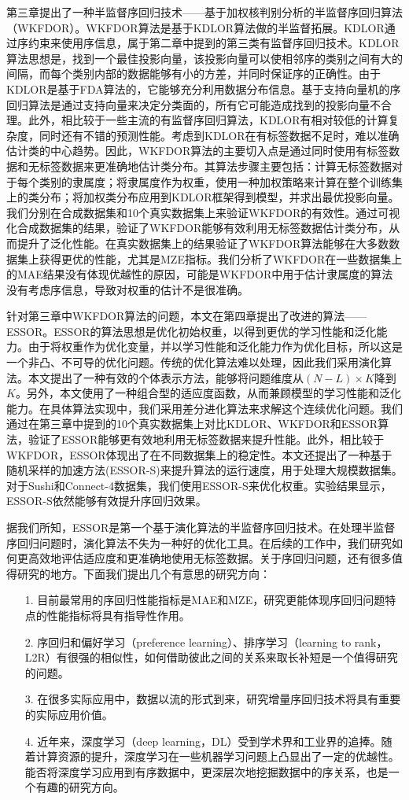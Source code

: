 第三章提出了一种半监督序回归技术——基于加权核判别分析的半监督序回归算法（WKFDOR）。WKFDOR算法是基于KDLOR算法做的半监督拓展。KDLOR通过序约束来使用序信息，属于第二章中提到的第三类有监督序回归技术。KDLOR算法思想是，找到一个最佳投影向量，该投影向量可以使相邻序的类别之间有大的间隔，而每个类别内部的数据能够有小的方差，并同时保证序的正确性。由于KDLOR是基于FDA算法的，它能够充分利用数据分布信息。基于支持向量机的序回归算法是通过支持向量来决定分类面的，所有它可能造成找到的投影向量不合理。此外，相比较于一些主流的有监督序回归算法，KDLOR有相对较低的计算复杂度，同时还有不错的预测性能。考虑到KDLOR在有标签数据不足时，难以准确估计类的中心趋势。因此，WKFDOR算法的主要切入点是通过同时使用有标签数据和无标签数据来更准确地估计类分布。其算法步骤主要包括：计算无标签数据对于每个类别的隶属度；将隶属度作为权重，使用一种加权策略来计算在整个训练集上的类分布；将加权类分布应用到KDLOR框架得到模型，并求出最优投影向量。我们分别在合成数据集和10个真实数据集上来验证WKFDOR的有效性。通过可视化合成数据集的结果，验证了WKFDOR能够有效利用无标签数据估计类分布，从而提升了泛化性能。在真实数据集上的结果验证了WKFDOR算法能够在大多数数据集上获得更优的性能，尤其是MZE指标。我们分析了WKFDOR在一些数据集上的MAE结果没有体现优越性的原因，可能是WKFDOR中用于估计隶属度的算法没有考虑序信息，导致对权重的估计不是很准确。

针对第三章中WKFDOR算法的问题，本文在第四章提出了改进的算法——ESSOR。ESSOR的算法思想是优化初始权重，以得到更优的学习性能和泛化能力。由于将权重作为优化变量，并以学习性能和泛化能力作为优化目标，所以这是一个非凸、不可导的优化问题。传统的优化算法难以处理，因此我们采用演化算法。本文提出了一种有效的个体表示方法，能够将问题维度从\((N-L)\times K\)降到\(K\)。另外，本文使用了一种组合型的适应度函数，从而兼顾模型的学习性能和泛化能力。在具体算法实现中，我们采用差分进化算法来求解这个连续优化问题。我们通过在第三章中提到的10个真实数据集上对比KDLOR、WKFDOR和ESSOR算法，验证了ESSOR能够更有效地利用无标签数据来提升性能。此外，相比较于WKFDOR，ESSOR体现出了在不同数据集上的稳定性。本文还提出了一种基于随机采样的加速方法(ESSOR-S)来提升算法的运行速度，用于处理大规模数据集。对于Sushi和Connect-4数据集，我们使用ESSOR-S来优化权重。实验结果显示，ESSOR-S依然能够有效提升序回归效果。

据我们所知，ESSOR是第一个基于演化算法的半监督序回归技术。在处理半监督序回归问题时，演化算法不失为一种好的优化工具。在后续的工作中，我们研究如何更高效地评估适应度和更准确地使用无标签数据。关于序回归问题，还有很多值得研究的地方。下面我们提出几个有意思的研究方向：
\begin{enumerate}
\item[1.]目前最常用的序回归性能指标是MAE和MZE，研究更能体现序回归问题特点的性能指标将具有指导性作用。
\item[2.]序回归和偏好学习（preference learning）、排序学习（learning to rank，L2R）有很强的相似性，如何借助彼此之间的关系来取长补短是一个值得研究的问题。
\item[3.]在很多实际应用中，数据以流的形式到来，研究增量序回归技术将具有重要的实际应用价值。
\item[4.]近年来，深度学习（deep learning，DL）受到学术界和工业界的追捧。随着计算资源的提升，深度学习在一些机器学习问题上凸显出了一定的优越性。能否将深度学习应用到有序数据中，更深层次地挖掘数据中的序关系，也是一个有趣的研究方向。
\end{enumerate}


